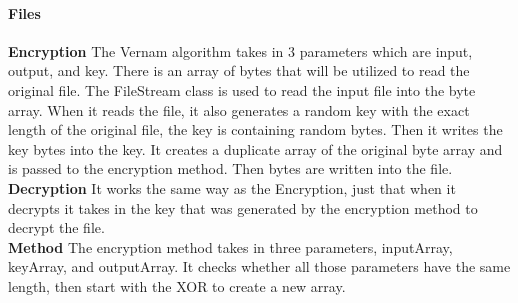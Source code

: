 \paragraph{Files\\}
\textbf{Encryption}
The Vernam algorithm takes in 3 parameters which are input, output, and key. There is an array of bytes that will be utilized to read the original file. The FileStream class is used to read the input file into the byte array. When it reads the file, it also generates a random key with the exact length of the original file, the key is containing random bytes. Then it writes the key bytes into the key. It creates a duplicate array of the original byte array and is passed to the encryption method. Then bytes are written into the file.\\

\textbf{Decryption}
It works the same way as the Encryption, just that when it decrypts it takes in the key that was generated by the encryption method to decrypt the file.\\

\textbf{Method}
The encryption method takes in three parameters, inputArray, keyArray, and outputArray. It checks whether all those parameters have the same length, then start with the XOR to create a new array.

